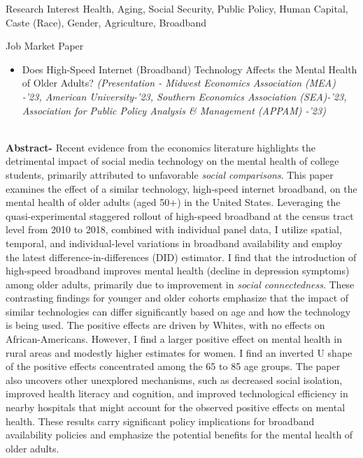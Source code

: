 \documentclass{resume} %
\begin{document}

\begin{rSection}{Research Interest}
Health, Aging, Social Security, Public Policy, Human Capital, Caste (Race), Gender, Agriculture, Broadband
\end{rSection}


\begin{rSection}{Job Market Paper}
\begin{itemize}
\item Does High-Speed Internet (Broadband) Technology Affects the Mental Health of Older Adults? \textit{\scriptsize{(Presentation - Midwest Economics Association (MEA) -'23, American University-'23, Southern Economics Association (SEA)-'23, Association for Public Policy Analysis \& Management (APPAM) -'23)}}
\end{itemize}
\\
\textbf{Abstract-} 
Recent evidence from the economics literature highlights the detrimental impact of social media technology on the mental health of college students, primarily attributed to unfavorable \textit{social comparisons}. This paper examines the effect of a similar technology, high-speed internet broadband, on the mental health of older adults (aged 50+) in the United States. Leveraging the quasi-experimental staggered rollout of high-speed broadband at the census tract level from 2010 to 2018, combined with individual panel data, I utilize spatial, temporal, and individual-level variations in broadband availability and employ the latest difference-in-differences (DID) estimator.
I find that the introduction of high-speed broadband improves mental health (decline in depression symptoms) among older adults, primarily due to improvement in \textit{social connectedness}.
These contrasting findings for younger and older cohorts emphasize that the impact of similar technologies can differ significantly based on age and how the technology is being used.
The positive effects are driven by Whites, with no effects on African-Americans.
However, I find a larger positive effect on mental health in rural areas and modestly higher estimates for women. 
I find an inverted U shape of the positive effects concentrated among the 65 to 85 age groups.
The paper also uncovers other unexplored mechanisms, such as decreased social isolation, improved health literacy and cognition, and improved technological efficiency in nearby hospitals that might account for the observed positive effects on mental health. These results carry significant policy implications for broadband availability policies and emphasize the potential benefits for the mental health of older adults.


\end{rSection}
\end{document}
